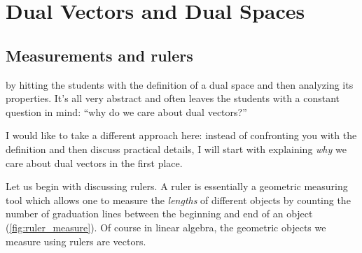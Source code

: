 \section{Dual Vectors and Dual Spaces}

\subsection{Measurements and rulers}
 by hitting the students with the definition of a dual space and then analyzing its properties. It's all very abstract and often leaves the students with a constant question in mind: \enquote{why do we care about dual vectors?}

I would like to take a different approach here: instead of confronting you with the definition and then discuss practical details, I will start with explaining \textit{why} we care about dual vectors in the first place.

Let us begin with discussing rulers. A ruler is essentially a geometric measuring tool which allows one to measure the \textit{lengths} of different objects by counting the number of graduation lines between the beginning and end of an object (\cref{fig:ruler_measure}). Of course in linear algebra, the geometric objects we measure using rulers are vectors.

